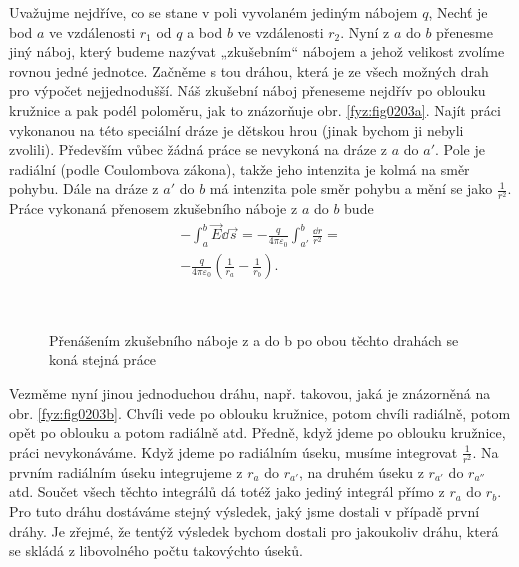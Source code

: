     Uvažujme nejdříve, co se stane v poli vyvolaném jediným nábojem \(q\), Nechť je bod \(a\) ve 
    vzdálenosti \(r_1\) od \(q\) a bod \(b\) ve vzdálenosti \(r_2\). Nyní z \(a\) do \(b\) přenesme 
    jiný náboj, který budeme nazývat „zkušebním“ nábojem a jehož velikost zvolíme rovnou jedné 
    jednotce. Začněme s tou dráhou, která je ze všech možných drah pro výpočet nejjednodušší. Náš 
    zkušební náboj přeneseme nejdřív po oblouku kružnice a pak podél poloměru, jak to znázorňuje 
    obr. \ref{fyz:fig0203a}. Najít práci vykonanou na této speciální dráze je dětskou hrou 
    (jinak bychom ji nebyli zvolili). Především vůbec žádná práce se nevykoná na dráze z \(a\) do 
    \(a'\). Pole je radiální (podle Coulombova zákona), takže jeho intenzita je kolmá na směr 
    pohybu. Dále na dráze z \(a'\) do \(b\) má intenzita pole směr pohybu a mění se jako 
    \(\frac{1}{r^2}\). Práce vykonaná přenosem zkušebního náboje z \(a\) do \(b\) bude
    \begin{equation}\label{fyz:eq286}
      \begin{multlined}
        -\int_{a}^{b}\vec{E}\dd{\vec{s}} = 
        -\frac{q}{4\pi\varepsilon_0}\int_{a'}^{b}\frac{\dd{r}}{r^2} =              \\
        -\frac{q}{4\pi\varepsilon_0}\left(\frac{1}{r_{a}}-\frac{1}{r_{b}}\right).  
      \end{multlined}
    \end{equation}

    \begin{figure}[ht!]
      \centering
         \\
      \caption{Přenášením zkušebního náboje z a do b po obou těchto drahách se koná stejná práce}
      \label{fyz:fig0203}
    \end{figure}
    
    Vezměme nyní jinou jednoduchou dráhu, např. takovou, jaká je znázorněná na obr. 
    \ref{fyz:fig0203b}. Chvíli vede po oblouku kružnice, potom chvíli radiálně, potom  opět 
    po oblouku a potom radiálně atd. Předně, když jdeme po oblouku kružnice, práci nevykonáváme. 
    Když jdeme po radiálním úseku, musíme integrovat \(\frac{1}{r^2}\). Na prvním radiálním úseku 
    integrujeme z \(r_{a}\) do \(r_{a'}\), na druhém úseku z \(r_{a'}\) do \(r_{a''}\) atd. Součet 
    všech těchto integrálů dá totéž jako jediný integrál přímo z \(r_{a}\) do \(r_{b}\). Pro tuto 
    dráhu dostáváme stejný výsledek, jaký jsme dostali v případě první dráhy. Je zřejmé, že tentýž 
    výsledek bychom dostali pro jakoukoliv dráhu, která se skládá z libovolného počtu takovýchto 
    úseků.
    
